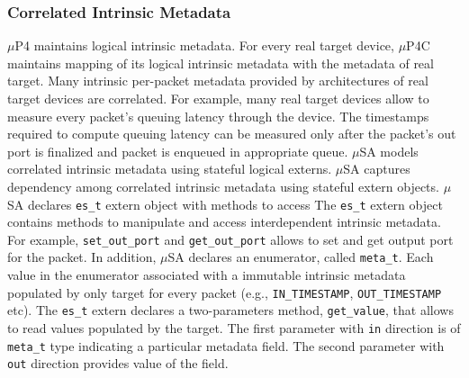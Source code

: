 \subsubsection{Correlated Intrinsic Metadata}
$\mu$P4 maintains logical intrinsic metadata. 
For every real target device, $\mu$P4C maintains mapping of its logical intrinsic metadata with the metadata of real target.
Many intrinsic per-packet metadata provided by architectures of real target devices are correlated.
For example, many real target devices allow to measure every packet's queuing latency through the device.
The timestamps required to compute queuing latency can be measured only after the packet's out port is finalized and packet is enqueued in appropriate queue.
$\mu$SA models correlated intrinsic metadata using stateful logical externs.
$\mu$SA captures dependency among correlated intrinsic metadata using stateful extern objects.
$\mu$SA declares \texttt{es\_t} extern object with methods to access 
The \texttt{es\_t} extern object contains methods to manipulate and access interdependent intrinsic metadata.
For example, \texttt{set\_out\_port} and \texttt{get\_out\_port} allows to set and get output port for the packet.
In addition, $\mu$SA declares an enumerator, called \texttt{meta\_t}.
Each value in the enumerator associated with a immutable intrinsic metadata populated by only target for every packet (e.g., \texttt{IN\_TIMESTAMP}, \texttt{OUT\_TIMESTAMP} etc).
The \texttt{es\_t} extern declares a two-parameters method, \texttt{get\_value}, that allows to read values populated by the target.
The first parameter with \texttt{in} direction is of \texttt{meta\_t} type indicating a particular metadata field.
The second parameter with \texttt{out} direction provides value of the field.

